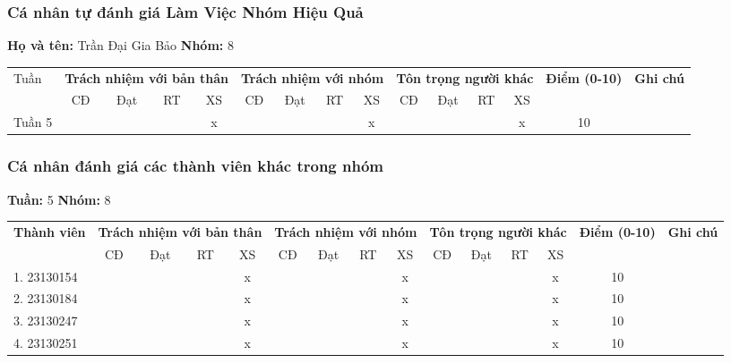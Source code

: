 \subsubsection*{Cá nhân tự đánh giá Làm Việc Nhóm Hiệu Quả}

\noindent \textbf{Họ và tên:} Trần Đại Gia Bảo \hrulefill \quad \textbf{Nhóm:} 8 \hrulefill

\vspace{0.5cm}

\begin{tabularx}{\linewidth}{|X|c|c|c|c|c|c|c|c|c|c|c|c|c|c|}
\hline
Tuần & \multicolumn{4}{c|}{\textbf{Trách nhiệm với bản thân}} & \multicolumn{4}{c|}{\textbf{Trách nhiệm với nhóm}} & \multicolumn{4}{c|}{\textbf{Tôn trọng người khác}} & \multirow{2}{1.5cm}{\textbf{Điểm (0-10)}} & \multirow{2}{1.5cm}{\textbf{Ghi chú}} \\ \cline{2-13}
 & CĐ & Đạt & RT & XS & CĐ & Đạt & RT & XS & CĐ & Đạt & RT & XS & & \\ \hline
  Tuần 5 & & & & x & & & & x & & & & x & 10 & \\ \hline
\end{tabularx}

\vspace{1cm}

\subsubsection*{Cá nhân đánh giá các thành viên khác trong nhóm}

\noindent \textbf{Tuần:} 5 \hrulefill \quad \textbf{Nhóm:} 8 \hrulefill

\vspace{0.5cm}

\begin{tabularx}{\linewidth}{|X|c|c|c|c|c|c|c|c|c|c|c|c|c|c|}
\hline
\multirow{2}{3cm}{\textbf{Thành viên}} & \multicolumn{4}{c|}{\textbf{Trách nhiệm với bản thân}} & \multicolumn{4}{c|}{\textbf{Trách nhiệm với nhóm}} & \multicolumn{4}{c|}{\textbf{Tôn trọng người khác}} & \multirow{2}{1.2cm}{\textbf{Điểm (0-10)}} & \multirow{2}{1.5cm}{\textbf{Ghi chú}} \\ \cline{2-13}
 & CĐ & Đạt & RT & XS & CĐ & Đạt & RT & XS & CĐ & Đạt & RT & XS & & \\ \hline
1. 23130154 & & & & x & & & & x & & & & x & 10 & \\ \hline
2. 23130184 & & & & x & & & & x & & & & x & 10 & \\ \hline
3. 23130247 & & & & x & & & & x & & & & x & 10 & \\ \hline
4. 23130251 & & & & x & & & & x & & & & x & 10 & \\ \hline
\end{tabularx}
